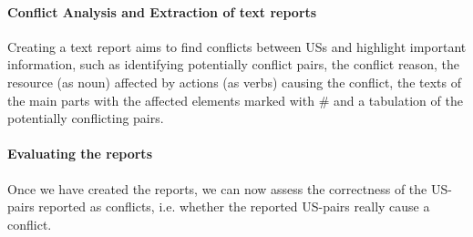 \paragraph{Conflict Analysis and Extraction of text reports} Creating a text report aims to find conflicts between USs and highlight important information, such as identifying potentially conflict pairs, the conflict reason, the resource (as noun) affected by actions (as verbs) causing the conflict, the texts of the main parts with the affected elements marked with \# and a tabulation of the potentially conflicting pairs.

\paragraph{Evaluating the reports} Once we have created the reports, we can now assess the correctness of the US-pairs reported as conflicts, i.e. whether the reported US-pairs really cause a conflict.

